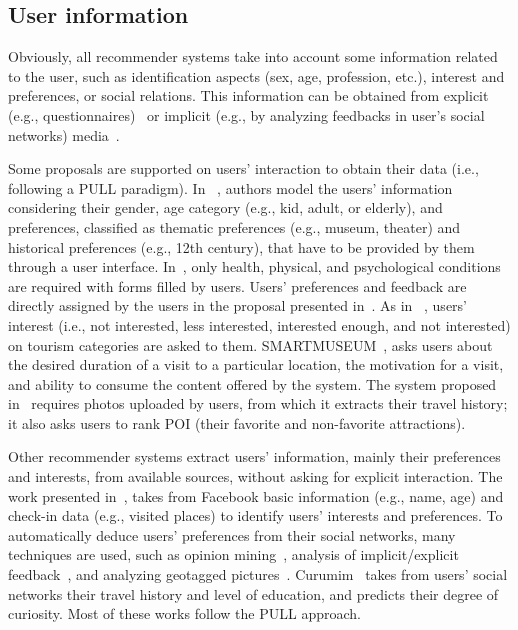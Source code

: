 \subsection{User information}
Obviously, all recommender systems take into account some information related to the user, such as identification aspects (sex, age, profession, etc.), interest and preferences, or social relations. This information can be obtained from explicit (e.g., questionnaires)~\cite{jannach2020interactive} or implicit (e.g., by analyzing feedbacks in user's social networks) media~\cite{lin2018hybrid}.  

Some proposals are supported on users' interaction to obtain their data (i.e., following a PULL paradigm). In  %
~\cite{rajaonarivo2019rec}, authors model the users' information considering their gender, age category (e.g., kid, adult, or elderly), and preferences, classified as thematic preferences (e.g., museum, theater) and historical preferences (e.g., 12th century), that have to be provided by them through a user interface.  In~\cite{santos2019using}, only health,  physical, and psychological conditions are required  with forms filled by users. 
Users' preferences and feedback are directly assigned by the users in the proposal presented in~\cite{bahramian_abbaspour_claramunt_2017}. As in ~\cite{arigi2018context}, users' interest (i.e., not interested, less interested, interested enough, and not interested) on tourism categories are asked to them. SMARTMUSEUM~\cite{ruotsalo2013smartmuseum}, asks users about the desired duration of a visit to a particular location, the motivation for a visit, and ability to consume the content offered by the system. The system proposed in~\cite{shen2016attraction} requires photos uploaded by users, from which it extracts their travel history; it also asks users to rank  POI (their favorite and non-favorite attractions).
 

Other recommender systems extract users' information, mainly their preferences and interests, from available sources,
without asking for explicit interaction.  The work presented in~\cite{kesorn2017personalized}, takes from Facebook basic information (e.g., name, age) and  check-in data (e.g., visited places)  to identify users' interests and preferences. 
To automatically deduce users' preferences from their social networks, many techniques are used, such as opinion mining~\cite{logesh2019exploring,logesh2018personalised}, analysis of implicit/explicit feedback~\cite{hidasi2016general}, and analyzing geotagged pictures~\cite{sun2019building}. 
Curumim~\cite{menk2017curumim} takes from users' social networks their travel history and level of education, and predicts their degree of curiosity. Most of these works follow the PULL approach.


